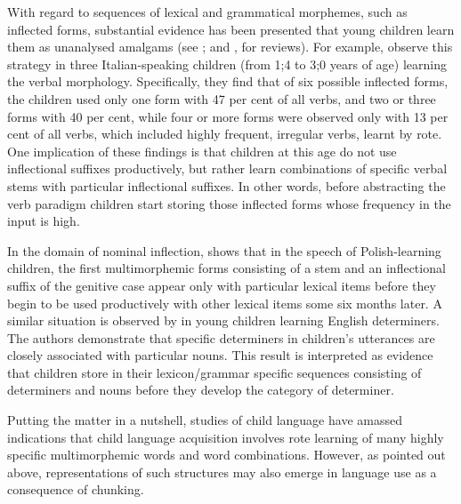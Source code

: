 With regard to sequences of lexical and grammatical morphemes, such as inflected forms, substantial evidence has been presented that young children learn them as unanalysed amalgams (see \citealt[][118-119]{tomasello-constructing-2003}; and \citealt[190-193]{clark-2009}, for reviews). For example, \citet{pizzuto-caselli-1992} observe this strategy in three Italian-speaking children (from 1;4 to 3;0 years of age) learning the verbal morphology. Specifically, they find that of six possible inflected forms, the children used only one form with 47 per cent of all verbs, and two or three forms with 40 per cent, while four or more forms were observed only with 13 per cent of all verbs, which included highly frequent, irregular verbs, learnt by rote. One implication of these findings is that children at this age do not use inflectional suffixes productively, but rather learn combinations of specific verbal stems with particular inflectional suffixes. In other words, before abstracting the verb paradigm children start storing those inflected forms whose frequency in the input is high. 
 
In the domain of nominal inflection, \citet{dabrowska-2004} shows that in the speech of Polish-learning children, the first multimorphemic forms consisting of a stem and an inflectional suffix of the genitive case appear only with particular lexical items before they begin to be used productively with other lexical items some six months later. A similar situation is observed by \citet{pine-lieven-1997} in young children learning English determiners. The authors demonstrate that specific determiners in children's utterances are closely associated with particular nouns. This result is interpreted as evidence that children store in their lexicon/grammar specific sequences consisting of determiners and nouns before they develop the category of determiner. 

Putting the matter in a nutshell, studies of child language have amassed indications that child language acquisition involves rote learning of many highly specific multimorphemic words and word combinations. However, as pointed out above, representations of such structures may also emerge in language use as a consequence of chunking.

